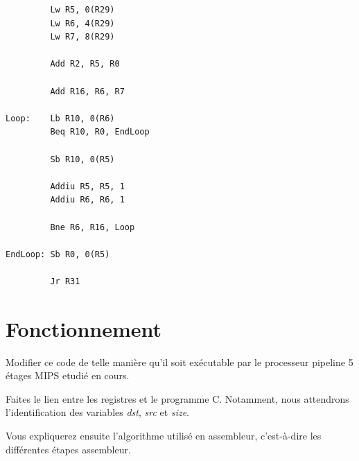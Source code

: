 \begin{verbatim}
         Lw R5, 0(R29)
         Lw R6, 4(R29)
         Lw R7, 8(R29)

         Add R2, R5, R0

         Add R16, R6, R7

Loop:    Lb R10, 0(R6)
         Beq R10, R0, EndLoop

         Sb R10, 0(R5)

         Addiu R5, R5, 1
         Addiu R6, R6, 1

         Bne R6, R16, Loop

EndLoop: Sb R0, 0(R5)

         Jr R31
\end{verbatim}

%
%

\section{Fonctionnement}

Modifier ce code de telle mani\`ere qu'il soit ex\'ecutable par le processeur
pipeline 5 \'etages MIPS etudi\'e en cours.

Faites le lien entre les registres et le programme C. Notamment,
nous attendrons l'identification des variables \textit{dst}, \textit{src}
et \textit{size}.

Vous expliquerez ensuite l'algorithme utilis\'e en assembleur, c'est-\`a-dire
les diff\'erentes \'etapes assembleur.


